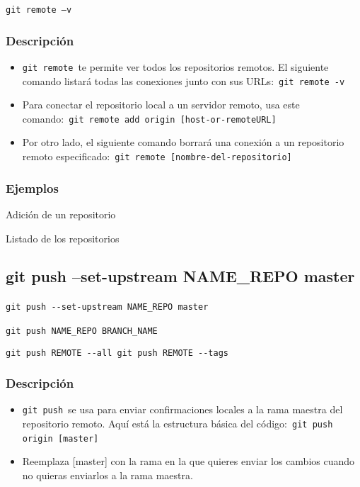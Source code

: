 \documentclass[
  a2paper,
]{article}
\begin{document}
\texttt{git\ remote\ –v}

\hypertarget{descripciuxf3n-5}{%
\subsubsection{Descripción}\label{descripciuxf3n-5}}

\begin{itemize}
\item
  \texttt{git\ remote}~te permite ver todos los repositorios remotos. El
  siguiente comando listará todas las conexiones junto con sus
  URLs:~\texttt{git\ remote\ -v}~~
\item
  Para conectar el repositorio local a un servidor remoto, usa este
  comando:~\texttt{git\ remote\ add\ origin\ {[}host-or-remoteURL{]}}~~
\item
  Por otro lado, el siguiente comando borrará una conexión a un
  repositorio remoto
  especificado:~\texttt{git\ remote\ {[}nombre-del-repositorio{]}}
\end{itemize}

\hypertarget{ejemplos-5}{%
\subsubsection{Ejemplos}\label{ejemplos-5}}

Adición de un repositorio~~

Listado de los repositorios

\hypertarget{git-push-set-upstream-name_repo-master}{%
\subsection{git push --set-upstream NAME\_REPO
master}\label{git-push-set-upstream-name_repo-master}}

\texttt{git\ push\ -\/-set-upstream\ NAME\_REPO\ master}~~

\texttt{git\ push\ NAME\_REPO\ BRANCH\_NAME}~~

\texttt{git\ push\ REMOTE\ -\/-all\ git\ push\ REMOTE\ -\/-tags}

\hypertarget{descripciuxf3n-6}{%
\subsubsection{Descripción}\label{descripciuxf3n-6}}

\begin{itemize}
\item
  \texttt{git\ push}~se usa para enviar confirmaciones locales a la rama
  maestra del repositorio remoto. Aquí está la estructura básica del
  código:~\texttt{git\ push\ \,origin\ {[}master{]}}~~
\item
  Reemplaza {[}master{]} con la rama en la que quieres enviar los
  cambios cuando no quieras enviarlos a la rama maestra.
\end{itemize}
\end{document}

